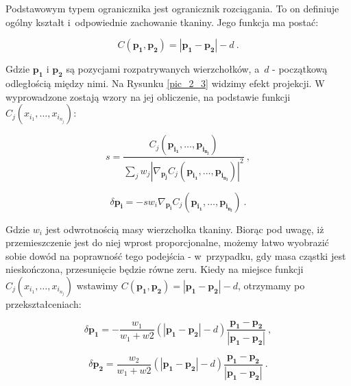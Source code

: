 			
			Podstawowym typem ogranicznika jest ogranicznik rozciągania. To on definiuje ogólny kształt i~odpowiednie zachowanie tkaniny. Jego funkcja ma postać:
			
			\begin{equation}
			C(\mathbf{p_{1}}, \mathbf{p_{2}}) = |\mathbf{p_{1}} - \mathbf{p_{2}}| - d \ .		
			\end{equation}
			
			Gdzie \( \mathbf{p_{1}} \) i \( \mathbf{p_{2}} \) są pozycjami rozpatrywanych wierzchołków, a~\(d\) - początkową odległością między nimi. Na Rysunku \ref{pic_2_3} widzimy efekt projekcji. W~\cite{posbased} wyprowadzone zostają wzory na jej obliczenie, na podstawie funkcji \( C_{j}(x_{i_{1}}, \dots, x_{i_{n_{j}}} ) \):
			
			\begin{equation}
			s = \frac{C_{j}(\mathbf{p_{i_{1}}}, \dots, \mathbf{p_{i_{n_{j}}}} )}{ \sum _{j} w_{j} | \nabla _{\mathbf{p_{j}}} C_{j}(\mathbf{p_{i_{1}}}, \dots, \mathbf{p_{i_{n_{j}}}} ) | ^{2} } \ ,		
			\end{equation}
			
			\begin{equation}
			\delta \mathbf{p_{i}} = -sw_{i} \nabla _{\mathbf{p_{i}}} C_{j}(\mathbf{p_{i_{1}}}, \dots, \mathbf{p_{i_{n_{j}}}} ) \ .
			\end{equation}
			
			Gdzie \(w_{i}\) jest odwrotnością masy wierzchołka tkaniny. Biorąc pod uwagę, iż przemieszczenie jest do niej wprost proporcjonalne, możemy łatwo wyobrazić sobie dowód na poprawność tego podejścia - w~przypadku, gdy masa cząstki jest nieskończona, przesunięcie będzie równe zeru. Kiedy na miejsce funkcji \(C_{j}(x_{i_{1}}, \dots, x_{i_{n_{j}}} ) \) wstawimy \(C(\mathbf{p_{1}}, \mathbf{p_{2}}) = |\mathbf{p_{1}} - \mathbf{p_{2}}| - d\), otrzymamy po przekształceniach: 
			
			\begin{equation}
			\delta \mathbf{p_{1}} = - \frac{w_{1}}{w_{1} + w{2}} (|\mathbf{p_{1}} - \mathbf{p_{2}}| - d) \frac{\mathbf{p_{1}} - \mathbf{p_{2}}}{|\mathbf{p_{1}} - \mathbf{p_{2}}|} \ ,
			\end{equation}
			
			\begin{equation}
			\delta \mathbf{p_{2}} = \frac{w_{2}}{w_{1} + w{2}} (|\mathbf{p_{1}} - \mathbf{p_{2}}| - d) \frac{\mathbf{p_{1}} - \mathbf{p_{2}}}{|\mathbf{p_{1}} - \mathbf{p_{2}}|} \ .
			\end{equation}
			
